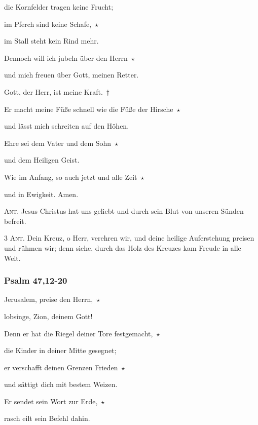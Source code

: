 die Kornfelder tragen keine Frucht; 

\noindent im Pferch sind keine Schafe,~$\star$~\nopagebreak

im Stall steht kein Rind mehr.

\noindent Dennoch will ich jubeln über den Herrn~$\star$~\nopagebreak

und mich freuen über Gott, meinen Retter.

\noindent Gott, der Herr, ist meine Kraft.~†~\nopagebreak

Er macht meine Füße schnell wie die Füße der Hirsche~$\star$~\nopagebreak

und lässt mich schreiten auf den Höhen.

\noindent Ehre sei dem Vater und dem Sohn~$\star$~\nopagebreak

und dem Heiligen Geist.

\noindent Wie im Anfang, so auch jetzt und alle Zeit~$\star$~\nopagebreak

und in Ewigkeit. Amen.

\vspace{10pt}

\noindent \textsc{Ant.} Jesus Christus hat uns geliebt und durch sein Blut von unseren Sünden befreit.

\vspace{10pt}

\noindent \textsc{3 Ant.} Dein Kreuz, o Herr, verehren wir, und deine heilige Auferstehung preisen und rühmen wir; denn siehe, durch das Holz des Kreuzes kam Freude in alle Welt.

\subsubsection{Psalm 47,12-20}

\noindent Jerusalem, preise den Herrn,~$\star$~\nopagebreak

lobsinge, Zion, deinem Gott!

\noindent Denn er hat die Riegel deiner Tore festgemacht,~$\star$~\nopagebreak

die Kinder in deiner Mitte gesegnet;

\noindent er verschafft deinen Grenzen Frieden~$\star$~\nopagebreak

und sättigt dich mit bestem Weizen.

\noindent Er sendet sein Wort zur Erde,~$\star$~\nopagebreak

rasch eilt sein Befehl dahin.

